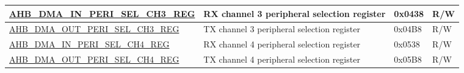 \begin{longtable}{ | l | p{10cm} | p{1.3cm} | l | }
\hyperref[regdesc:AHBDMAINPERISELCHNREG]{AHB\_DMA\_IN\_PERI\_SEL\_CH3\_REG} & RX channel 3 peripheral selection register & 0x0438 & R/W \\ \hline
\hyperref[regdesc:AHBDMAOUTPERISELCHNREG]{AHB\_DMA\_OUT\_PERI\_SEL\_CH3\_REG} & TX channel 3 peripheral selection register & 0x04B8 & R/W \\ \hline
\hyperref[regdesc:AHBDMAINPERISELCHNREG]{AHB\_DMA\_IN\_PERI\_SEL\_CH4\_REG} & RX channel 4 peripheral selection register & 0x0538 & R/W \\ \hline
\hyperref[regdesc:AHBDMAOUTPERISELCHNREG]{AHB\_DMA\_OUT\_PERI\_SEL\_CH4\_REG} & TX channel 4 peripheral selection register & 0x05B8 & R/W \\ \hline
\end{longtable}
